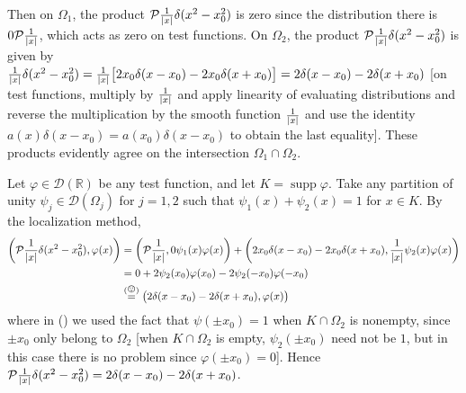 \documentclass[11pt]{article}
\newcommand{\eq}[1]{\overset{(#1)}{=}}
\DeclareMathOperator{\supp}{supp}
\begin{document}
\begin{enumerate}
    Then on $\Omega_1$, the product $\mathcal{P}\frac{1}{\abs{x}}\delta(x^2-x_0^2)$ is zero since the distribution there is $0\mathcal{P}\frac{1}{\abs{x}}$, which acts as zero on test functions. On $\Omega_2$, the product $\mathcal{P}\frac{1}{\abs{x}}\delta(x^2-x_0^2)$ is given by $\frac{1}{\abs{x}}\delta(x^2-x_0^2) = \frac{1}{\abs{x}}\big[2x_0\delta(x-x_0) - 2x_0\delta(x+x_0)\big] = 2\delta(x-x_0)-2\delta(x+x_0)$ [on test functions, multiply by $\frac{1}{\abs{x}}$ and apply linearity of evaluating distributions and reverse the multiplication by the smooth function $\frac{1}{\abs{x}}$ and use the identity $a(x)\delta(x-x_0) = a(x_0)\delta(x-x_0)$ to obtain the last equality]. These products evidently agree on the intersection $\Omega_1\cap\Omega_2$. 

    Let $\varphi\in\mathcal{D}(\mathbb{R})$ be any test function, and let $K =\supp\varphi$. Take any partition of unity $\psi_j\in\mathcal{D}(\Omega_j)$ for $j =1,2$ such that $\psi_1(x) +\psi_2(x) = 1$ for $x\in K$. By the localization method, \begin{align*}
        \bigg(\mathcal{P}\frac{1}{\abs{x}}\delta(x^2-x_0^2),\varphi(x)\bigg) &= \bigg(\mathcal{P}\frac{1}{\abs{x}},0\psi_1(x)\varphi(x)\bigg) + \bigg(2x_0\delta(x-x_0) - 2x_0\delta(x+x_0),\frac{1}{\abs{x}}\psi_2(x)\varphi(x)\bigg)\\
        &= 0 + 2\psi_2(x_0)\varphi(x_0) - 2\psi_2(-x_0)\varphi(-x_0)\\
        &\eq{\smiley} \big(2\delta(x-x_0)-2\delta(x+x_0),\varphi(x)\big)
    \end{align*} where in (\smiley) we used the fact that $\psi(\pm x_0) = 1$ when $K\cap \Omega_2$ is nonempty, since $\pm x_0$ only belong to $\Omega_2$ [when $K\cap \Omega_2$ is empty, $\psi_2(\pm x_0)$ need not be $1$, but in this case there is no problem since $\varphi(\pm x_0) = 0$]. Hence $\mathcal{P}\frac{1}{\abs{x}}\delta(x^2-x_0^2) = 2\delta(x-x_0)-2\delta(x+x_0)$.

    \hrulefill


\end{enumerate}
\end{document}
